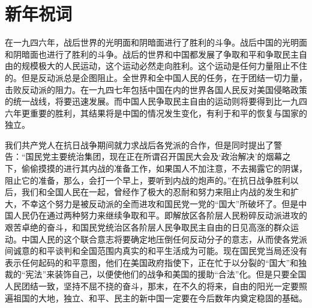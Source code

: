 \section[新年祝词（一九四七年一月）]{新年祝词}


在一九四六年，战后世界的光明面和阴暗面进行了胜利的斗争。战后中国的光明面和阴暗面也进行了胜利的斗争。战后的世界和中国都发展了争取和平和争取民主自由的规模极大的人民运动，这个运动必然走向胜利。这个运动是任何力量阻止不住的。但是反动派总是企图阻止。全世界和全中国人民的任务，在于团结一切力量，击败反动派的阻力。在一九四七年包括中国在内的世界各国人民反对美国侵略政策的统一战线，将要迅速发展。而中国人民争取民主自由的运动则将要得到比一九四六年更重要的胜利，其结果将是中国的情况发生变化，有利于和平的恢复与国家的独立。

我们共产党人在抗日战争期间就力求战后各党派的合作，但是同时提出了警告：“国民党主要统治集团，现在正在所谓召开国民大会及‘政治解决’的烟幕之下，偷偷摸摸的进行其内战的准备工作，如果国人不加注意，不去揭露它的阴谋，阻止它的准备，那么，会打一个早上，要听到内战的炮声的。”在抗日战争胜利以后，我们和全国人民在一起，曾经作了极大的忍耐和努力来阻止内战的发生和扩大，不幸这个努力是被反动派的全而进攻和国民党一党的“国大”所破坏了。但是中国人民仍在通过两种努力来继续争取和平。即解放区各阶层人民粉碎反动派进攻的艰苦卓绝的奋斗，和国民党统治区各阶层人民争取民主自由的日见高涨的群众运动。中国人民的这个联合意志将要确定地压倒任何反动分子的意志，从而使各党派间诚意的和平谈判和全国范围内真实的和平生活成为可能。现在国民党当局还没有表示任何起码的和平意图，他们在美国政府指使下，正在忙于以分裂的“国大”和独裁的“宪法”来装饰自己，以便使他们的战争和美国的援助“合法”化。但是只要全国人民团结一致，坚持不屈不挠的奋斗，那末，在不久的将来，自由的阳光一定要照遍祖国的大地，独立、和平、民主的新中国一定要在今后数年内奠定稳固的基础。

